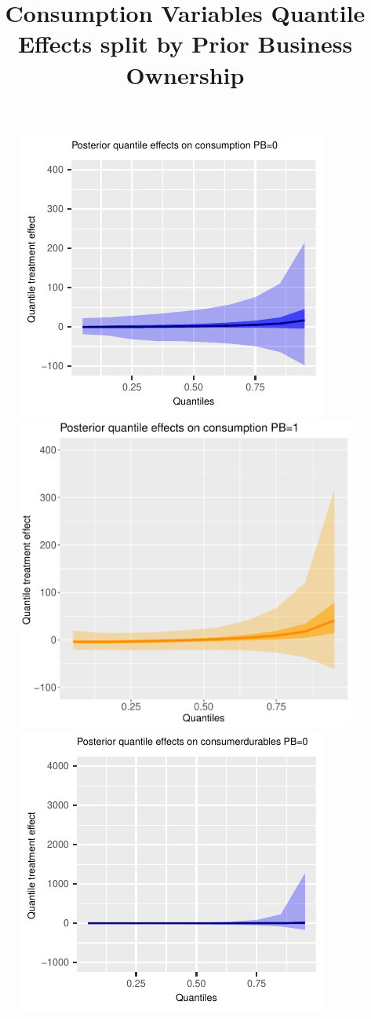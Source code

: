 \documentclass[AER]{AEA}
\begin{document}
 \begin{figure}[h!]
  \centering
  \title{Consumption Variables Quantile Effects split by Prior Business Ownership}
    \includegraphics{posterior_parent_quantile_TEs_consumption_pb_0_lognormal.pdf}
    \includegraphics{posterior_parent_quantile_TEs_consumption_pb_1_lognormal.pdf}\\
    \includegraphics{posterior_parent_quantile_TEs_consumerdurables_pb_0_lognormal.pdf}

\end{figure}
\end{document}
